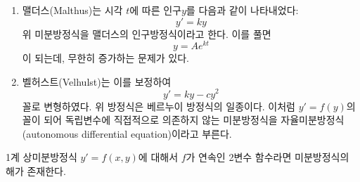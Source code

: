\documentclass[../engineering_mathematics_lecture_note.tex]{subfiles}
\begin{document}
\begin{definition}
    \begin{enumerate}
        \item 맬더스(Malthus)는 시각 $t$에 따른 인구$y$를 다음과 같이 나타내었다:
            \begin{equation*}
                y' = ky
            \end{equation*}
            위 미분방정식을 맬더스의 인구방정식이라고 한다.
            이를 풀면
            \begin{equation*}
                y = A e^{kt}
            \end{equation*}
            이 되는데, 무한히 증가하는 문제가 있다.
        \item 벨허스트(Velhulst)는 이를 보정하여
            \begin{equation*}
                y' = ky - cy^2
            \end{equation*}
            꼴로 변형하였다.
            위 방정식은 베르누이 방정식의 일종이다.
            이처럼 $y' = f(y)$의 꼴이 되어 독립변수에 직접적으로 의존하지 않는 미분방정식을 자율미분방정식(autonomous differential equation)이라고 부른다.
    \end{enumerate}
\end{definition}

\begin{theorem}
    1계 상미분방정식 $y' = f(x, y)$에 대해서 $f$가 연속인 2변수 함수라면 미분방정식의 해가 존재한다.
\end{theorem}
\end{document}
